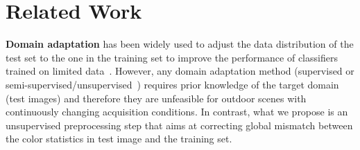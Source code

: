 \section{Related Work}
\label{sect:SotA} \textbf{Domain adaptation} has been widely used
to adjust the data distribution of the test set to the one in the
training set to improve the performance of classifiers trained on
limited data~\cite{XRV2013, Vazquez:2013b,LixinPAMI2012}. However,
any domain adaptation method (supervised or
semi-supervised/unsupervised~\cite{XRV2013}) requires prior
knowledge of the target domain (test images) and therefore they
are unfeasible for outdoor scenes with continuously changing
acquisition conditions. In contrast, what we propose is an
unsupervised preprocessing step that aims at correcting global
mismatch between the color statistics in test image and the
training set.
%
%


